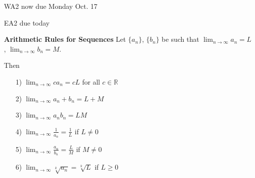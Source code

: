 
WA2 now due Monday Oct. 17

EA2 due today

\begin{thm}
\textbf{Arithmetic Rules for Sequences} Let $\{a_n\}$, $\{b_n\}$ be such that $\lim_{n\to\infty}a_n = L$, $\lim_{n\to\infty}b_n = M$.

Then
\begin{enumerate}
\item[1)] $\lim_{n\to\infty} ca_n = cL$ for all $c\in \mathbb{R}$
\item[2)] $\lim_{n\to\infty} a_n+b_n = L + M$
\item[3)] $\lim_{n\to\infty} a_nb_n = LM$
\item[4)] $\displaystyle\lim_{n\to \infty} \frac{1}{a_n} = \frac{1}{L}$ if $L\neq 0$
\item[5)] $\displaystyle \lim_{n\to\infty} \frac{a_n}{b_n} = \frac{L}{M}$ if $M\neq 0$
\item[6)] $\displaystyle \lim_{n\to\infty} \sqrt[k]{a_n} = \sqrt[k]{L}$ if $L\geq 0$
\end{enumerate}
\end{thm}

